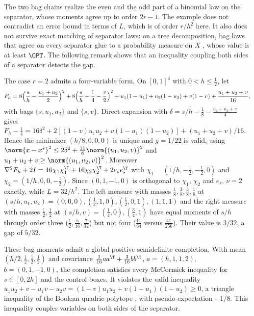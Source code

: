 The two bag chains realize the even and the odd part of a binomial law on the
separator, whose moments agree up to order $2r-1$. The example does not
contradict an error bound in terms of $L$, which is of order $r/h^2$ here. It
also does not survive exact matching of separator laws: on a tree
decomposition, bag laws that agree on every separator glue to a probability
measure on $X$ \cite{Vorobev1962}, whose value is at least $\OPT$. The
following remark shows that an inequality coupling both sides of a separator
detects the gap.

\begin{remark}\label{lim:rem:moments}
The case $r=2$ admits a four-variable form. On $[0,1]^4$ with
$0<h\le\frac12$, let
\[
F_h=8\Bigl(\frac sh-\frac{u_1+u_2}2\Bigr)^2+8\Bigl(\frac sh-\frac14-\frac v2
\Bigr)^2+u_1(1-u_1)+u_2(1-u_2)+v(1-v)+\frac{u_1+u_2+v}{16},
\]
with bags $\{s,u_1,u_2\}$ and $\{s,v\}$. Direct expansion with
$\delta=s/h-\frac18-\frac{u_1+u_2+v}4$ gives
$F_h-\frac14=16\delta^2+2[(1-v)u_1u_2+v(1-u_1)(1-u_2)]+(u_1+u_2+v)/16$.
Hence the minimizer $(h/8,0,0,0)$ is unique and $g=1/22$ is valid, using
$\norm{x-x^*}^2\le2\delta^2+\frac{11}8\norm{(u_1,u_2,v)}^2$ and
$u_1+u_2+v\ge\norm{(u_1,u_2,v)}^2$. Moreover
$\nabla^2F_h+2I=16\chi_1\chi_1^{\T}+16\chi_2\chi_2^{\T}+2e_se_s^{\T}$ with
$\chi_1=(1/h,-\frac12,-\frac12,0)$ and $\chi_2=(1/h,0,0,-\frac12)$. Since
$(0,1,-1,0)$ is orthogonal to $\chi_1$, $\chi_2$ and $e_s$, $\nu=2$ exactly,
while $L=32/h^2$. The left measure with masses
$\frac18,\frac38,\frac38,\frac18$ at $(s/h,u_1,u_2)=(0,0,0),(\frac12,1,0),
(\frac12,0,1),(1,1,1)$ and the right measure with masses $\frac12,\frac12$
at $(s/h,v)=(\frac14,0),(\frac34,1)$ have equal moments of $s/h$ through order
three ($\frac12,\frac5{16},\frac7{32}$) but not four ($\frac{11}{64}$ versus
$\frac{41}{256}$). Their value is $3/32$, a gap of $5/32$.

These bag moments admit a global positive semidefinite completion.
With mean $(h/2,\frac12,\frac12,\frac12)$ and covariance
$\frac1{16}aa^{\T}+\frac3{16}bb^{\T}$, $a=(h,1,1,2)$,
$b=(0,1,-1,0)$, the completion satisfies every McCormick inequality for
$s\in[0,2h]$ and the control boxes. It violates the valid inequality
$u_1u_2+v-u_1v-u_2v=(1-v)u_1u_2+v(1-u_1)(1-u_2)\ge0$, a triangle inequality
of the Boolean quadric polytope \cite{Padberg1989}, with pseudo-expectation
$-1/8$. This inequality couples variables on both sides of the separator.
\end{remark}
